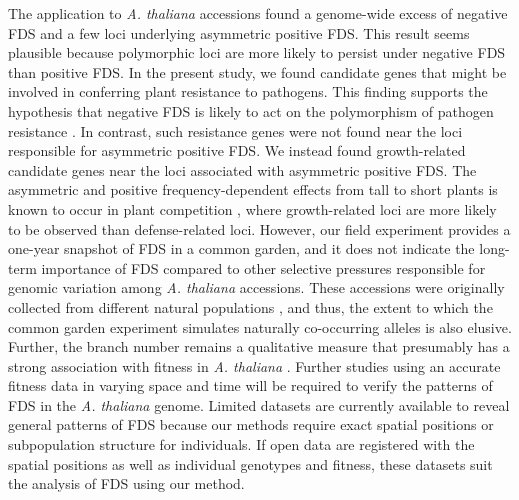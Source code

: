 \documentclass[12pt,]{article}
\begin{document}
The application to \textit{A. thaliana} accessions found a genome-wide excess of negative FDS and a few loci underlying asymmetric positive FDS. This result seems plausible because polymorphic loci are more likely to persist under negative FDS than positive FDS. In the present study, we found candidate genes that might be involved in conferring plant resistance to pathogens. This finding supports the hypothesis that negative FDS is likely to act on the polymorphism of pathogen resistance \citep{antonovics1984experimental, brunet2000disease}. In contrast, such resistance genes were not found near the loci responsible for asymmetric positive FDS. We instead found growth-related candidate genes near the loci associated with asymmetric positive FDS. The asymmetric and positive frequency-dependent effects from tall to short plants is known to occur in plant competition \citep{weiner1990asymmetric}, where growth-related loci are more likely to be observed than defense-related loci. However, our field experiment provides a one-year snapshot of FDS in a common garden, and it does not indicate the long-term importance of FDS compared to other selective pressures responsible for genomic variation among \textit{A. thaliana} accessions. These accessions were originally collected from different natural populations \citep{horton_genome-wide_2012, alonso-blanco_1135_2016}, and thus, the extent to which the common garden experiment simulates naturally co-occurring alleles is also elusive. Further, the branch number remains a qualitative measure that presumably has a strong association with fitness in \textit{A. thaliana} \citep{chong2018note}. Further studies using an accurate fitness data in varying space and time will be required to verify the patterns of FDS in the \textit{A. thaliana} genome. Limited datasets are currently available to reveal general patterns of FDS because our methods require exact spatial positions or subpopulation structure for individuals. If open data are registered with the spatial positions as well as individual genotypes and fitness, these datasets suit the analysis of FDS using our method.
\end{document}
